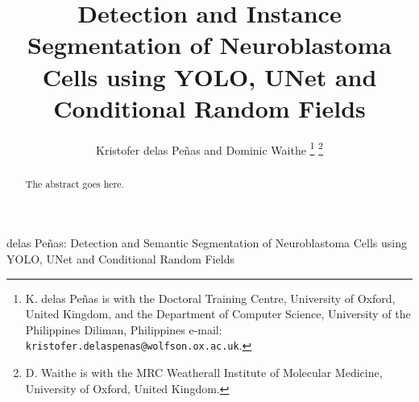 \documentclass[journal]{IEEEtran}
\begin{document}
%
\title{Detection and Instance Segmentation of Neuroblastoma Cells using YOLO, UNet and Conditional Random Fields}

\author{Kristofer delas Pe\~nas and
        Dominic Waithe%
\thanks{K. delas Pe\~nas is with the Doctoral Training Centre, University of Oxford, United Kingdom, and the Department of Computer Science, University of the Philippines Diliman, Philippines e-mail: \texttt{kristofer.delaspenas@wolfson.ox.ac.uk}.}%
\thanks{D. Waithe is with the MRC Weatherall Institute of Molecular Medicine, University of Oxford, United Kingdom.}}%

%
{delas Pe\~nas: Detection and Semantic Segmentation of Neuroblastoma Cells using YOLO, UNet and Conditional Random Fields}
% 











\maketitle

\begin{abstract}
The abstract goes here.
\end{abstract}
\end{document}

